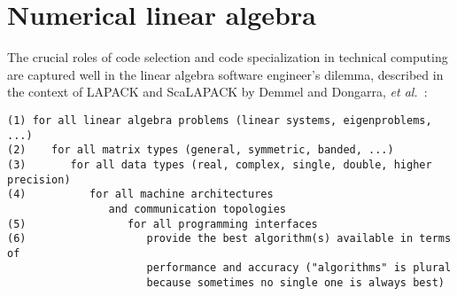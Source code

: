 
\iffalse
\section{Array views}

tim holy in issue 8839:

``without staged functions in my initial post in 8235. The take-home message: generating all methods through dimension 8 resulted in more than 5000 separate methods, and required over 4 minutes of parsing \& lowering time (i.e., a 4-minute delay while compiling julia). By comparison, the stagedfunction implementation loads in a snap, and of course can go even beyond 8 dimensions.''
\fi

\section{Numerical linear algebra}
\label{sec:linalg}

The crucial roles of code selection and code specialization in technical
computing are captured well in the linear algebra software engineer's dilemma,
described in the context of LAPACK and ScaLAPACK by Demmel and Dongarra,
\textit{et al.}~\cite{lawn181}:
\vspace{-4ex}
\begin{singlespace}
\begin{small}
\begin{verbatim}
(1) for all linear algebra problems (linear systems, eigenproblems, ...)
(2)    for all matrix types (general, symmetric, banded, ...)
(3)       for all data types (real, complex, single, double, higher precision)
(4)          for all machine architectures
                and communication topologies
(5)                for all programming interfaces
(6)                   provide the best algorithm(s) available in terms of
                      performance and accuracy ("algorithms" is plural
                      because sometimes no single one is always best)
\end{verbatim}
\end{small}
\end{singlespace}

